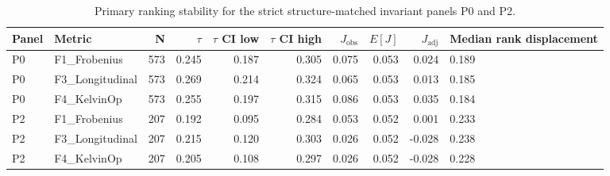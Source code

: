 \begin{table}[t]
\centering
\caption{Primary ranking stability for the strict structure-matched invariant panels P0 and P2.}
\label{tab:primary_ranking}
\begin{tabular}{llrrrrrrr}
\toprule
Panel & Metric & N & $\tau$ & $\tau$ CI low & $\tau$ CI high & $J_{\text{obs}}$ & $E[J]$ & $J_{\text{adj}}$ & Median rank displacement \\
\midrule
P0 & F1_Frobenius & 573 & 0.245 & 0.187 & 0.305 & 0.075 & 0.053 & 0.024 & 0.189 \\
P0 & F3_Longitudinal & 573 & 0.269 & 0.214 & 0.324 & 0.065 & 0.053 & 0.013 & 0.185 \\
P0 & F4_KelvinOp & 573 & 0.255 & 0.197 & 0.315 & 0.086 & 0.053 & 0.035 & 0.184 \\
P2 & F1_Frobenius & 207 & 0.192 & 0.095 & 0.284 & 0.053 & 0.052 & 0.001 & 0.233 \\
P2 & F3_Longitudinal & 207 & 0.215 & 0.120 & 0.303 & 0.026 & 0.052 & -0.028 & 0.238 \\
P2 & F4_KelvinOp & 207 & 0.205 & 0.108 & 0.297 & 0.026 & 0.052 & -0.028 & 0.228 \\
\bottomrule
\end{tabular}
\end{table}
